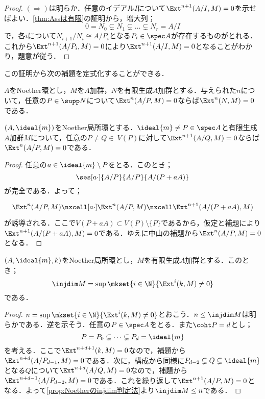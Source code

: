\begin{proof}
	$(\Longrightarrow)$は明らか．任意のイデアル$I$について$\Ext^{n+1}(A/I,M)=0$を示せばよい．\ref{thm:Assは有限}の証明から，増大列；
	\[0=N_0\subsetneq N_1\subsetneq\dots\subsetneq N_r=A/I\]
	で，各$i$について$N_{i+1}/N_i\cong A/P_i$となる$P_i\in\spec A$が存在するものがとれる．これから$\Ext^{n+1}(A/P_i,M)=0$により$\Ext^{n+1}(A/I,M)=0$となることがわかり，題意が従う．
\end{proof}

この証明から次の補題を定式化することができる．

\begin{lem}
	$A$をNoether環とし，$M$を$A$加群，$N$を有限生成$A$加群とする．与えられた$n$について，任意の$P\in\supp N$について$\Ext^n(A/P,M)=0$ならば$\Ext^n(N,M)=0$である．
\end{lem}

\begin{lem}
	$(A,\ideal{m})$をNoether局所環とする．$\ideal{m}\neq P\in\spec A$と有限生成$A$加群$M$について，任意の$P\neq Q\in\ V(P)$に対して$\Ext^{n+1}(A/Q,M)=0$ならば$\Ext^n(A/P,M)=0$である．
\end{lem}

\begin{proof}
	任意の$a\in\ideal{m}\setminus P$をとる．このとき；
	\[\ses[a\cdot]{A/P}{A/P}{A/(P+aA)}\]
	が完全である．よって；
	\[\begin{tikzcd}
		\Ext^n(A/P,M)\nxcell[a\cdot]\Ext^n(A/P,M)\nxcell\Ext^{n+1}(A/(P+aA),M)
	\end{tikzcd}\]
	が誘導される．ここで$V(P+aA)\subset V(P)\setminus\{P\}$であるから，仮定と補題により$\Ext^{n+1}(A/(P+aA),M)=0$である．ゆえに中山の補題から$\Ext^n(A/P,M)=0$となる．
\end{proof}

\begin{thm}\label{thm:Noether局所環上の入射次元}
	$(A,\ideal{m},k)$をNoether局所環とし，$M$を有限生成$A$加群とする．このとき；
	\[\injdim M=\sup\mkset{i\in\N}{\Ext^i(k,M)\neq0}\]
	である．
\end{thm}

\begin{proof}
	$n=\sup\mkset{i\in\N}{\Ext^i(k,M)\neq0}$とおこう．$n\leq\injdim M$は明らかである．逆を示そう．任意の$P\in\spec A$をとる．また$\coht P=d$とし；
	\[P=P_0\subsetneq\cdots\subsetneq P_d=\ideal{m}\]
	を考える．ここで$\Ext^{n+d+1}(k,M)=0$なので，補題から$\Ext^{n+d}(A/P_{d-1},M)=0$である．次に，構成から同様に$P_{d-2}\subsetneq Q\subsetneq \ideal{m}$となる$Q$について$\Ext^{n+d}(A/Q,M)=0$なので，補題から$\Ext^{n+d-1}(A/P_{d-2},M)=0$である．これを繰り返して$\Ext^{n+1}(A/P,M)=0$となる．よって\ref{prop:Noetherのinjdim判定法}より$\injdim M\leq n$である．
\end{proof}

